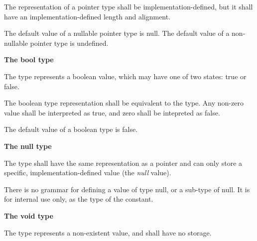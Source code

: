 \specsubsubitem
The representation of a pointer type shall be implementation-defined, but it
shall have an implementation-defined length and alignment.

\specsubsubitem
The default value of a nullable pointer type is null. The default value of a
non-nullable pointer type is undefined.


\textbf{The bool type}

\specsubsubitem
The  type represents a boolean value, which may have one of two
states: true or false.

\specsubsubitem
The boolean type representation shall be equivalent to the  type.
Any non-zero value shall be interpreted as true, and zero shall be intepreted as
false.

\specsubsubitem
The default value of a boolean type is false.

\textbf{The null type}

\specsubsubitem
The  type shall have the same representation as a pointer and can
only store a specific, implementation-defined value (the \textit{null} value).

\specsubsubitem
There is no grammar for defining a value of type null, or a sub-type of null. It
is for internal use only, as the type of the  constant.

\textbf{The void type}

\specsubsubitem
The  type represents a non-existent value, and shall have no
storage.


\begin{grammar}
 \\
	 \terminal{\{}  \terminal{\}} \\
	 \terminal{\{}  \terminal{\}} \\

 \\
	 \optional{\terminal{,}} \\
	 \terminal{,}  \\

 \\
	 \terminal{:}  \\
	 \\
	 \\
\end{grammar}

